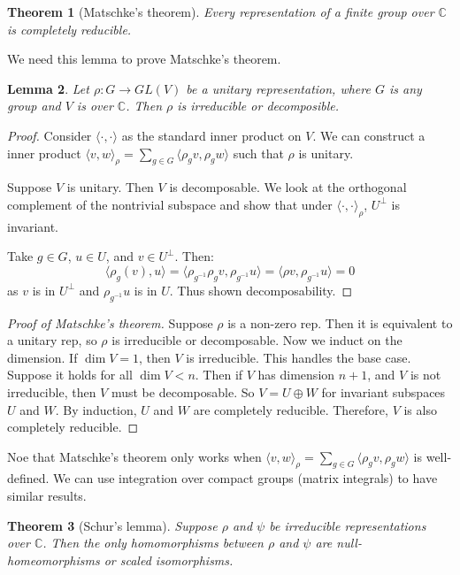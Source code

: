 \documentclass[]{report}
\newtheorem{theorem}{Theorem}
\newtheorem{lemma}[theorem]{Lemma}
\theoremstyle{definition}
\numberwithin{theorem}{section}
\numberwithin{equation}{section}
\begin{document}
\begin{theorem}[Matschke's theorem]
	Every representation of a finite group over $\mathbb{C}$ is completely reducible. 
\end{theorem}


We need this lemma to prove Matschke's theorem.

\begin{lemma}
	Let $\rho : G \rightarrow GL(V)$ be a unitary representation, where $G$ is any group and $V$ is over $\mathbb{C}$. Then $\rho$ is irreducible or decomposible. 
\end{lemma}
\begin{proof}
	Consider $\langle \cdot , \cdot \rangle$ as the standard inner product on $V$. We can construct a inner product
	$\langle v,w \rangle_\rho = \sum_{g \in G} \langle \rho_g v , \rho_g w \rangle$
	such that $\rho$ is unitary.
	
Suppose $V$ is unitary. Then $V$ is decomposable. We look at the orthogonal complement of the nontrivial subspace and show that under $\langle \cdot, \cdot \rangle_\rho$, $U^\bot$ is invariant. 

Take $g \in G$, $u \in U$, and $v \in U^\bot$. 
Then:
\begin{equation}
	\langle \rho_g(v), u \rangle = \langle \rho_{g^{-1}} \rho_g v, \rho_{g^{-1}} u \rangle = \langle \rho v, \rho_{g^{-1}} u \rangle = 0
\end{equation}
as $v$ is in $U^\bot$ and $\rho_{g^{-1}} u$ is in $U$. Thus shown decomposability. 
\end{proof}

\begin{proof}[Proof of Matschke's theorem]
	Suppose $\rho$ is a non-zero rep. Then it is equivalent to a unitary rep, so $\rho$ is irreducible or decomposable. Now we induct on the dimension. If $\dim V = 1$, then $V$ is irreducible. This handles the base case. Suppose it holds for all $\dim V < n$. Then if $V$ has dimension $n + 1$, and $V$ is not irreducible, then $V$ must be decomposable. So $V = U \oplus W$ for invariant subspaces $U$ and $W$. By induction, $U$ and $W$ are completely reducible. Therefore, $V$ is also completely reducible.
\end{proof}
Noe that Matschke's theorem only works when $\langle v,w \rangle_\rho = \sum_{g \in G} \langle \rho_g v , \rho_g w \rangle$ is well-defined. We can use integration over compact groups (matrix integrals) to have similar results. 


\begin{theorem}[Schur's lemma]
	Suppose $\rho$ and $\psi$ be irreducible representations over $\mathbb{C}$. Then the only homomorphisms between $\rho$ and $\psi$ are null-homeomorphisms or scaled isomorphisms. 
\end{theorem}
\end{document}
